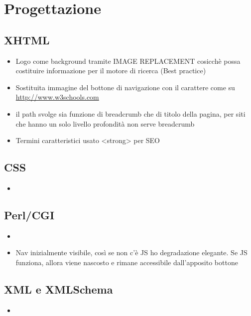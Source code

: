 \documentclass[../relazione.tex]{subfiles}
\begin{document}
\section{Progettazione}
	\subsection{XHTML}
	\begin{itemize}
		\item Logo come background tramite IMAGE REPLACEMENT cosicchè possa costituire informazione per il motore di ricerca (Best practice)
		\item Sostituita immagine del bottone di navigazione con il carattere come su \url{http://www.w3schools.com}
		\item il path svolge sia funzione di breadcrumb che di titolo della pagina, per siti che hanno un solo livello profondità non serve breadcrumb
		\item Termini caratteristici usato <strong> per SEO
	\end{itemize}
	\subsection{CSS}
	\begin{itemize}
		\item 
	\end{itemize}
	\subsection{Perl/CGI}
	\begin{itemize}
		\item 
	\end{itemize}
	\begin{itemize}
		\item Nav inizialmente visibile, così se non c'è JS ho degradazione elegante. Se JS funziona, allora viene nascosto e rimane accessibile dall'apposito bottone
	\end{itemize}
	\subsection{XML e XMLSchema}
	\begin{itemize}
		\item 
	\end{itemize}
\end{document}
